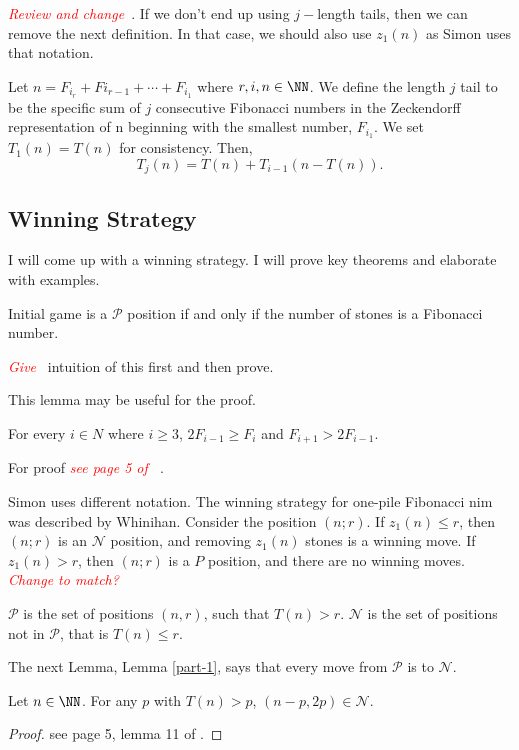 \documentclass[11pt,twoside]{scrartcl}
\newcommand{\mcP}{\mathcal{P}}
\newcommand{\msN}{\mathscr{N}}
\newcommand{\msP}{\mathscr{P}}
\newcommand{\TODO}[1]{\emph{\textcolor{red}{#1\ }}}
\begin{document}
\TODO{Review and change}. If we don't end up using $j-$length tails, then we can remove the next definition. In that case, we should also use $z_1(n)$ as Simon uses that notation.

\begin{definition}
    Let $n = F_{i_r} +F{i_{r-1}} + \cdots +F_{i_1}$ where $r,i, n \in \NN$. We define the length $j$ tail to be the specific sum of $j$ consecutive Fibonacci numbers in the
    Zeckendorff representation of n beginning with the smallest number, $F_{i_1}$. We set
    $T_1(n) = T (n)$ for consistency. Then, 
    \[T_j(n) = T (n) + T_{i-1}(n - T (n)).\]
    
\end{definition}

\subsection{Winning Strategy}
I will come up with a winning strategy. I will prove key theorems and elaborate with examples.

\begin{theorem}\label{thm-fibp}
    Initial game is a $\mcP$ position if and only if the number of stones is a Fibonacci number.
\end{theorem}
\TODO{Give} intuition of this first and then prove.

This lemma may be useful for the proof.
\begin{lemma}
    For every $i \in N$ where $i \ge 3$, $2F_{i-1} \ge F_i$ and $F_{i+1} > 2F_{i-1}$.
\end{lemma}
For proof \TODO{see page 5 of \cite{cody}}.

\begin{remark}
    Simon uses different notation. The winning strategy for one-pile Fibonacci nim was described by Whinihan. Consider the position $(n;r)$. If $z_1(n) \le r$, then $(n;r)$ is an $\msN$ position, and removing $z_1(n)$ stones is a winning move. If $z_1(n) > r$, then $(n;r)$ is a $P$ position, and there are no winning moves. \TODO{Change to match?}
\end{remark}
\begin{claim}\label{claim-part}
    $\msP$ is the set of positions $(n, r)$, such that $T(n) > r$. $\msN$ is the set of positions not in $\msP$, that is $T(n) \le r$.
\end{claim}

The next Lemma, Lemma \ref{part-1}, says that every move from $\msP$ is to $\msN$.
\begin{lemma}\label{part-1}
    Let $n \in \NN$. For any $p$ with $T (n) > p$, $(n-p, 2p) \in \msN$.
\end{lemma}
\begin{proof}
    \TBD see page 5, lemma 11 of \cite{cody}.
\end{proof}
\end{document}
